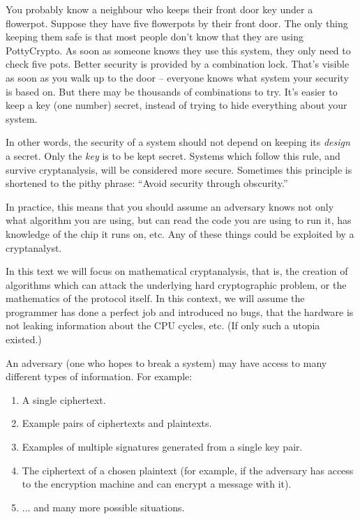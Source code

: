 \documentclass{article}
\theoremstyle{plain}
\theoremstyle{definition}
\theoremstyle{remark}
\numberwithin{theorem}{section}
\begin{document}
 You probably know a neighbour who keeps their front door key under a flowerpot.  Suppose they have five flowerpots by their front door.  The only thing keeping them safe is that most people don't know that they are using PottyCrypto\texttrademark.  As soon as someone knows they use this system, they only need to check five pots.  Better security is provided by a combination lock.  That's visible as soon as you walk up to the door -- everyone knows what system your security is based on.  But there may be thousands of combinations to try.  It's easier to keep a key (one number) secret, instead of trying to hide everything about your system.

 In other words, the security of a system should not depend on keeping its \emph{design} a secret.  Only the \emph{key} is to be kept secret.  Systems which follow this rule, and survive cryptanalysis, will be considered more secure.
 Sometimes this principle is shortened to the pithy phrase:  ``Avoid security through obscurity.''
 
 In practice, this means that you should assume an adversary knows not only what algorithm you are using, but can read the code you are using to run it, has knowledge of the chip it runs on, etc.  Any of these things could be exploited by a cryptanalyst.

  In this text we will focus on mathematical cryptanalysis, that is, the creation of algorithms which can attack the underlying hard cryptographic problem, or the mathematics of the protocol itself.  In this context, we will assume the programmer has done a perfect job and introduced no bugs, that the hardware is not leaking information about the CPU cycles, etc.  (If only such a utopia existed.)
  
An adversary (one who hopes to break a system) may have access to many different types of information.  For example:

\begin{enumerate}
	\item A single ciphertext.
	\item Example pairs of ciphertexts and plaintexts.
	\item Examples of multiple signatures generated from a single key pair.
	\item The ciphertext of a chosen plaintext (for example, if the adversary has access to the encryption machine and can encrypt a message with it).
	\item ... and many more possible situations.
\end{enumerate}
\end{document}

